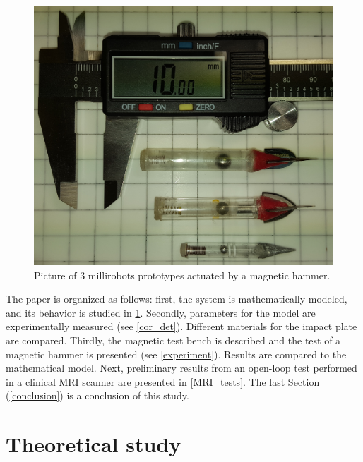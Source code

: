 \documentclass[letterpaper, 10 pt, conference]{ieeeconf}  %
\begin{document}
\begin{figure}
  \includegraphics[width=\linewidth]{robots_prototypes.jpg}
  \caption{Picture of 3 millirobots prototypes actuated by a magnetic hammer.}
  \label{prototypes}
  \vspace{-2em}
\end{figure}

The paper is organized as follows: first, the system is mathematically modeled, and its behavior is studied in \cref{theoretical}. Secondly, parameters for the model are experimentally measured (see \cref{cor_det}). Different materials for the impact plate are compared. Thirdly, the magnetic test bench is described and the test of a magnetic hammer is presented (see \cref{experiment}). Results are compared to the mathematical model. Next, preliminary results from an open-loop test performed in a clinical MRI scanner are presented in \cref{MRI_tests}. The last Section (\cref{conclusion}) is a conclusion of this study.


\section{Theoretical study}
\label{theoretical}
\end{document}
